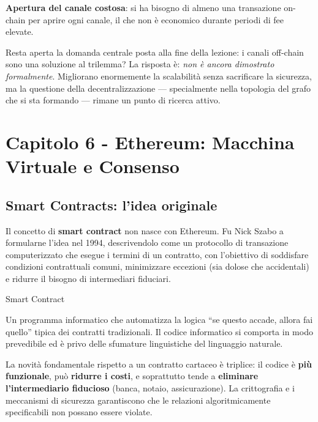 \documentclass[
  italian,
  openany]{book}
\begin{document}
\textbf{Apertura del canale costosa}: si ha bisogno di almeno una
transazione on-chain per aprire ogni canale, il che non è economico
durante periodi di fee elevate.

Resta aperta la domanda centrale posta alla fine della lezione: i canali
off-chain sono una soluzione al trilemma? La risposta è: \emph{non è
ancora dimostrato formalmente}. Migliorano enormemente la scalabilità
senza sacrificare la sicurezza, ma la questione della decentralizzazione
--- specialmente nella topologia del grafo che si sta formando ---
rimane un punto di ricerca attivo.

\newpage

\chapter{Capitolo 6 - Ethereum: Macchina Virtuale e
Consenso}\label{capitolo-6---ethereum-macchina-virtuale-e-consenso}

\section{Smart Contracts: l'idea
originale}\label{smart-contracts-lidea-originale}

Il concetto di \textbf{smart contract} non nasce con Ethereum. Fu Nick
Szabo a formularne l'idea nel 1994, descrivendolo come un protocollo di
transazione computerizzato che esegue i termini di un contratto, con
l'obiettivo di soddisfare condizioni contrattuali comuni, minimizzare
eccezioni (sia dolose che accidentali) e ridurre il bisogno di
intermediari fiduciari.

\begin{calloutdefinition}{Smart Contract}

Un programma informatico che automatizza la logica ``se questo accade,
allora fai quello'' tipica dei contratti tradizionali. Il codice
informatico si comporta in modo prevedibile ed è privo delle sfumature
linguistiche del linguaggio naturale.

\end{calloutdefinition}

La novità fondamentale rispetto a un contratto cartaceo è triplice: il
codice è \textbf{più funzionale}, può \textbf{ridurre i costi}, e
soprattutto tende a \textbf{eliminare l'intermediario fiducioso} (banca,
notaio, assicurazione). La crittografia e i meccanismi di sicurezza
garantiscono che le relazioni algoritmicamente specificabili non possano
essere violate.
\end{document}
